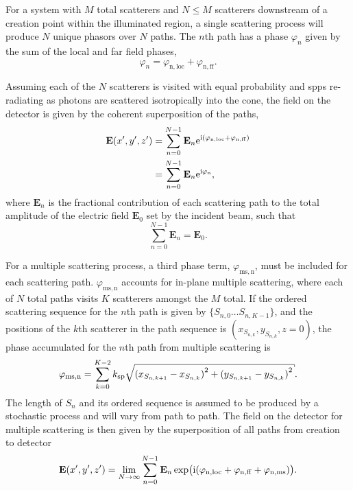 For a system with $M$ total scatterers and $N \leq M$ scatterers downstream of
a creation point within the illuminated region, a single scattering process
will produce $N$ unique phasors over $N$ paths.  The $n$th path has a
phase $\varphi_n$ given by the sum of the local and far field phases,
\begin{equation}
  \varphi_n = \varphi_\mathrm{n,loc}+\varphi_\mathrm{n,ff}.
\end{equation}

Assuming each of the $N$ scatterers is visited with equal probability and \glspl{spp}
re-radiating as photons are scattered isotropically into the cone, the field
on the detector is given by the coherent superposition of the paths,
\begin{align}
  \mathbf{E}(x^\prime,y^\prime,z^\prime) & =
  \sum_{n=0}^{N-1}
  \mathbf{E}_n {\mathrm{e}}^{{\mathrm{i}}{(\varphi_\mathrm{n,loc}+\varphi_\mathrm{n,ff})}} \\
                                         & =
  \sum_{n=0}^{N-1}
  \mathbf{E}_n {\mathrm{e}}^{{\mathrm{i}}{\varphi_\mathrm{n}}},
\end{align}
where $\mathbf{E}_n$ is the fractional contribution of each scattering path to
the total amplitude of the electric field $\mathbf{E}_0$ set by the incident
beam, such that
\begin{equation}
  \sum_{n=0}^{N-1}\mathbf{E}_n = \mathbf{E}_0.
\end{equation}

For a multiple scattering process, a third phase term,
$\varphi_\mathrm{ms,n}$, must be included for each scattering path.
$\varphi_\mathrm{ms,n}$ accounts for in-plane multiple scattering, where each
of $N$ total paths visits $K$ scatterers amongst the $M$ total.  If the
ordered scattering sequence for the $n$th path is given by $\{S_{n,0} \ldots
  S_{n,{K-1}}\}$, and the positions of the $k$th scatterer in the path sequence
is $(x_{S_{n,k}},y_{S_{n,k}},z=0)$, the phase accumulated for the $n$th path from
multiple scattering is
\begin{equation}
  \varphi_\mathrm{ms,n}=\sum_{k=0}^{K-2}
  \ksp \sqrt{{(x_{S_{n,{k+1}}}-x_{S_{n,k}})}^2+{(y_{S_{n,{k+1}}}-y_{S_{n,k}})}^2}.
  \label{eqn:multiplescatteringphase}
\end{equation}
The length of $S_n$ and its ordered sequence is assumed to be produced by a stochastic
process and will vary from path to path.  The field on the detector
for multiple scattering is then given by the superposition of all paths from
creation to detector
\begin{equation}
  \mathbf{E}(x^\prime,y^\prime,z^\prime) =
  \lim_{N\to\infty}
  \sum_{n=0}^{N-1}
  \mathbf{E}_n
  \exp\!\big({{\mathrm{i}}{(\varphi_\mathrm{n,loc}+\varphi_\mathrm{n,ff}+\varphi_\mathrm{n,ms})}}\big).
  \label{eqn:smicromsphase}
\end{equation}

